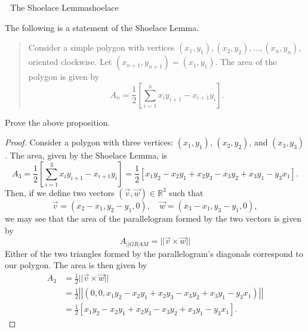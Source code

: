         \pagebreak
        \begin{exercise}{\Difficulty\,\Difficulty\,\Difficulty\,\,The Shoelace Lemma}{shoelace}
        
            The following is a statement of the Shoelace Lemma.
            \begin{quote}
                Consider a simple polygon with vertices \((x_1, y_1), (x_2, y_2), \ldots, (x_n, y_n)\), oriented clockwise. Let \((x_{n+1}, y_{n+1})=(x_1, y_1)\). The area of the polygon is given by
                \begin{equation*}
                    A_n=\frac{1}{2}\left[\sum_{i=1}^n x_iy_{i+1}-x_{i+1}y_i \right].
                \end{equation*}
            \end{quote}
            Prove the above proposition.
            \begin{proof}
                Consider a polygon with three vertices: \((x_1, y_1)\), \((x_2, y_2)\), and \((x_3, y_3)\). The area, given by the Shoelace Lemma, is
                \begin{equation*}
                    A_3=\frac{1}{2}\left[\sum_{i=1}^3 x_iy_{i+1}-x_{i+1}y_i \right]=\frac{1}{2}\left[x_1y_2-x_2y_1+x_2y_3-x_3y_2+x_3y_1-y_3x_1\right].
                \end{equation*}
                Then, if we define two vectors \((\vec{v},\vec{w})\in\mathbb{R}^3\) such that
                \begin{equation*}
                    \vec{v}=(x_2-x_1, y_2-y_1, 0),\quad\vec{w}=(x_3-x_1, y_3-y_1, 0),
                \end{equation*}
                we may see that the area of the parallelogram formed by the two vectors is given by
                \begin{equation*}
                    A_{||GRAM}=||\vec{v} \times \vec{w}||
                \end{equation*}
                Either of the two triangles formed by the parallelogram's diagonals correspond to our polygon. The area is then given by
                \begin{align*}
                    A_3&=\frac{1}{2}||\vec{v} \times \vec{w}|| \\
                    &=\frac{1}{2}\left|\left|(0, 0, x_1y_2-x_2y_1+x_2y_3-x_3y_2+x_3y_1-y_3x_1)\right|\right| \\
                    &=\frac{1}{2}\left[x_1y_2-x_2y_1+x_2y_3-x_3y_2+x_3y_1-y_3x_1\right].
                \end{align*}

\end{proof}
\end{exercise}
